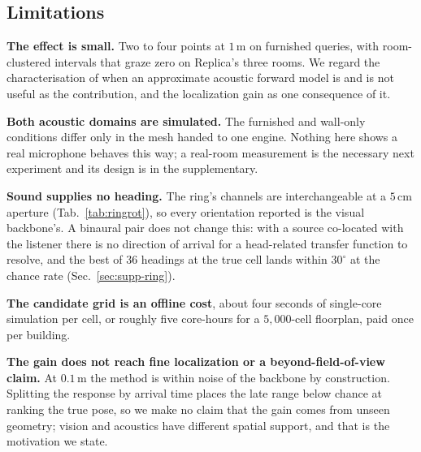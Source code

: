 \subsection{Limitations}
\label{sec:limits}

\textbf{The effect is small.} Two to four points at $1$\,m on furnished
queries, with room-clustered intervals that graze zero on Replica's three rooms.
We regard the characterisation of when an approximate acoustic forward model
is and is not useful as the contribution, and the localization gain as one
consequence of it.

\textbf{Both acoustic domains are simulated.} The furnished and wall-only
conditions differ only in the mesh handed to one engine. Nothing here shows a
real microphone behaves this way; a real-room measurement is the necessary next
experiment and its design is in the supplementary.

\textbf{Sound supplies no heading.} The ring's channels are interchangeable at
a $5$\,cm aperture (Tab.~\ref{tab:ringrot}), so every orientation reported is
the visual backbone's. A binaural pair does not change this: with a source
co-located with the listener there is no direction of arrival for a head-related
transfer function to resolve, and the best of $36$ headings at the true cell
lands within $30^\circ$ at the chance rate (Sec.~\ref{sec:supp-ring}).

\textbf{The candidate grid is an offline cost}, about four seconds of
single-core simulation per cell, or roughly five core-hours for a
$5{,}000$-cell floorplan, paid once per building.

\textbf{The gain does not reach fine localization or a beyond-field-of-view
claim.} At $0.1$\,m the method is within noise of the backbone by construction.
Splitting the response by arrival time places the late range below chance at
ranking the true pose, so we make no claim that the gain comes from unseen
geometry; vision and acoustics have different spatial support, and that is the
motivation we state.

